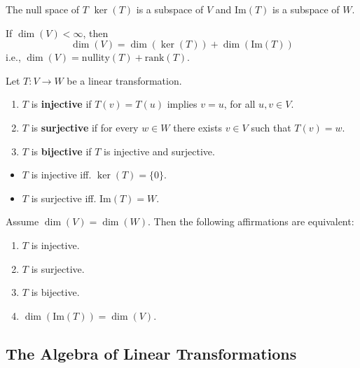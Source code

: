 \begin{theorem}
	The null space of $T$ $\ker(T) $ is a subspace of $V$ and $\text{Im}(T)$ is a subspace of $W$.
\end{theorem}

\begin{theorem}\label{thm:rank-null}
	If $\dim(V) < \infty$, then
	\[
		\dim(V) = \dim(\ker(T)) + \dim(\text{Im}(T))
	\]
	i.e., $\dim(V) = \text{nullity}(T) + \text{rank}(T)$.
\end{theorem}

\begin{definition}
	Let $T : V \longrightarrow W$ be a linear transformation. 
	\begin{enumerate}
		\item $T$ is \textbf{injective} if $T(v) = T(u)$ implies $v = u$, for all $u, v \in V$.
		\item $T$ is \textbf{surjective} if for every $w \in W$ there exists $v \in V$ such that $T(v) = w$.
		\item $T$ is \textbf{bijective} if $T$ is injective and surjective.
	\end{enumerate}
\end{definition}

\begin{theorem}\hfill
	\begin{itemize}
		\item $T$ is injective iff. $\ker(T)  = \{ 0 \}$.	
		\item $T$ is surjective iff. $\text{Im}(T) = W$.
	\end{itemize}
\end{theorem}

\begin{theorem}
	Assume $\dim(V) = \dim(W)$. Then the following affirmations are equivalent:
	\begin{enumerate}
		\item $T$ is injective.
		\item $T$ is surjective.
		\item $T$ is bijective.
		\item $\dim(\text{Im}(T)) = \dim(V)$. 
	\end{enumerate}
\end{theorem}

\subsection*{The Algebra of Linear Transformations}


